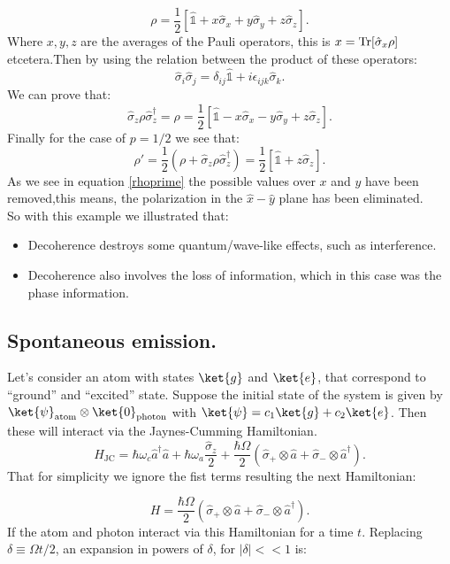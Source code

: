 \begin{appendix}
\begin{equation}
\rho=\frac{1}{2}\left[\hat{\mathds{1}}+x\hat{\sigma}_x+y\hat{\sigma}_y+z\hat{\sigma}_z\right].
\label{Blochapendix}
\end{equation}
Where $x,y,z$ are the averages of the Pauli operators, this is $x=\textnormal{Tr}[\hat{\sigma}_x\rho]$ etcetera.Then by using the relation between the product of these operators:
\[
\hat{\sigma}_i\hat{\sigma}_j=\delta_{ij}\hat{\mathds{1}}+i\epsilon_{ijk}\hat{\sigma}_k.
\]
We can prove that:
\[
\hat{\sigma}_z\rho\hat{\sigma}_z^{\dagger}=\rho=\frac{1}{2}\left[\hat{\mathds{1}}-x\hat{\sigma}_x-y\hat{\sigma}_y+z\hat{\sigma}_z\right].
\]
Finally for the case of $p=1/2$ we see that:
\begin{equation}
\rho'=\frac{1}{2}(\rho+\hat{\sigma}_z\rho\hat{\sigma}_z^{\dagger})= \frac{1}{2}\left[\hat{\mathds{1}}+z\hat{\sigma}_z\right].
\label{rhoprime}
\end{equation}
As we see in equation \eqref{rhoprime} the possible values over $x$ and $y$ have been removed,this means, the polarization in the  $\hat{x}-\hat{y}$ plane has been eliminated.\\
So with this example we illustrated that:
\begin{itemize}
\item Decoherence destroys some quantum/wave-like effects, such as interference.
\item Decoherence also involves the loss of information, which in  this case was the phase information.

\end{itemize}
\subsection{Spontaneous emission.}\label{spontaneous emission}
Let's consider an atom with states $\ket{g}$ and $\ket{e}$, that correspond to ``ground'' and ``excited'' state. Suppose the initial state of the system is given by 
$\ket{\psi}_{\text{atom}}\otimes \ket{0}_{\text{photon}}$ with $\ket{\psi}=c_1\ket{g}+c_2\ket{e}$.
 Then these will interact via the Jaynes-Cumming Hamiltonian.
\[{\hat  {H}}_{{{\text{JC}}}}=\hbar \omega _{c}{\hat  {a}}^{{\dagger }}{\hat  {a}}+\hbar \omega _{a}{\frac  {{\hat  {\sigma }}_{z}}{2}}+\frac  {\hbar \Omega }{2}\left({\hat  {\sigma }}_{+}\otimes{\hat  {a}}+{\hat  {\sigma }}_{-}\otimes{\hat  {a}}^{{\dagger }}\right).\]
That for simplicity we ignore the fist terms resulting the next Hamiltonian:

\begin{equation}
H=\frac  {\hbar \Omega }{2}\left({\hat  {\sigma }}_{+}\otimes{\hat  {a}}+{\hat  {\sigma }}_{-}\otimes{\hat  {a}}^{{\dagger }}\right).
\label{hamiltonianjaynes-cummings}
\end{equation}
If the atom and photon interact via this Hamiltonian for a time $t$. Replacing $\delta\equiv\Omega t/2$, an expansion in powers of $\delta$, for $\mid\delta\mid<<1$ is:


\end{appendix}
